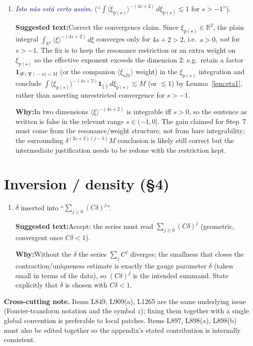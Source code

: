 \documentclass[11pt]{article}
\newcommand{\R}{\mathbb{R}}
\newcommand{\TT}{\mathbf{T}}
\newcommand{\jap}[1]{\langle #1\rangle}
\newcommand{\ind}{\mathbf{1}}
\newcommand{\sbf}{\mathrm{p}}
\newcommand{\com}[1]{\textit{\textcolor{blue}{#1}}}
\newcommand{\sugg}[1]{\par\smallskip\textbf{Suggested text:}\quad #1}
\newcommand{\why}[1]{\par\smallskip\textbf{Why:}\quad #1\par\medskip}
\begin{document}
\begin{enumerate}[leftmargin=*]
\item[\textbf{L2265}] \com{Isto n\~ao est\'a certo assim.} (``$\int
\jap{\xi_{\sbf(\star)}}^{-(4s+2)}\,d\xi_{\sbf(\star)}\lesssim1$ for $s>-1$'').
\sugg{Correct the convergence claim. Since $\xi_{\sbf(\star)}\in\R^2$, the
plain integral $\int_{\R^2}\jap{\xi}^{-(4s+2)}\,d\xi$ converges only for
$4s+2>2$, i.e.\ $s>0$, \emph{not} for $s>-1$. The fix is to keep the
resonance restriction or an extra weight on $\xi_{\sbf(\star)}$ so the
effective exponent exceeds the dimension $2$: e.g.\ retain a factor
$\ind_{|\Psi(\TT)-\alpha|<M}$ (or the companion $\jap{\xi_{\star21}}$ weight)
in the $\xi_{\sbf(\star)}$ integration and conclude
$\int\jap{\xi_{\sbf(\star)}}^{-(4s+2)}\ind_{\{\cdot\}}\,d\xi_{\sbf(\star)}
\lesssim M$ (or $\lesssim1$) by Lemma~\ref{lem:eta1}, rather than asserting
unrestricted convergence for $s>-1$.}
\why{In two dimensions $\jap{\xi}^{-(4s+2)}$ is integrable iff $s>0$, so the
sentence as written is false in the relevant range $s\in(-1,0]$. The
gain claimed for Step~7 must come from the resonance/weight structure, not
from bare integrability; the surrounding $\delta^{(2s+2)(j-3)}M$ conclusion is
likely still correct but the intermediate justification needs to be redone
with the restriction kept.}

\end{enumerate}

\section*{Inversion / density (\S4)}

\begin{enumerate}[leftmargin=*]

\item[\textbf{L2540}] \com{$\delta$} inserted into ``$\sum_{j\ge0}(C\delta)^j$''.
\sugg{Accept: the series must read $\sum_{j\ge0}(C\delta)^j$ (geometric,
convergent once $C\delta<1$).}
\why{Without the $\delta$ the series $\sum_j C^j$ diverges; the smallness that
closes the contraction/uniqueness estimate is exactly the gauge parameter
$\delta$ (taken small in terms of the data), so $(C\delta)^j$ is the intended
summand. State explicitly that $\delta$ is chosen with $C\delta<1$.}

\end{enumerate}

\bigskip
\noindent\textbf{Cross-cutting note.} Items L849, L909(a), L1265 are the same
underlying issue (Fourier-transform notation and the symbol $z$); fixing them
together with a single global convention is preferable to local patches.
Items L897, L898(a), L898(b) must also be edited together so the appendix's
stated contribution is internally consistent.
\end{document}
